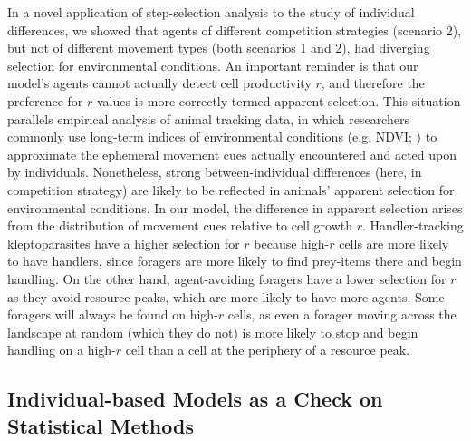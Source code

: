 In a novel application of step-selection analysis to the study of individual differences, we showed that agents of different competition strategies (scenario 2), but not of different movement types (both scenarios 1 and 2), had diverging selection for environmental conditions.
An important reminder is that our model's agents cannot actually detect cell productivity $r$, and therefore the preference for $r$ values is more correctly termed apparent selection.
This situation parallels empirical analysis of animal tracking data, in which researchers commonly use long-term indices of environmental conditions (e.g. NDVI; \citealt{pettorelli2011}) to approximate the ephemeral movement cues actually encountered and acted upon by individuals.
Nonetheless, strong between-individual differences (here, in competition strategy) are likely to be reflected in animals' apparent selection for environmental conditions.
In our model, the difference in apparent selection arises from the distribution of movement cues relative to cell growth $r$.
Handler-tracking kleptoparasites have a higher selection for $r$ because high-$r$ cells are more likely to have handlers, since foragers are more likely to find prey-items there and begin handling.
On the other hand, agent-avoiding foragers have a lower selection for $r$ as they avoid resource peaks, which are more likely to have more agents.
Some foragers will always be found on high-$r$ cells, as even a forager moving across the landscape at random (which they do not) is more likely to stop and begin handling on a high-$r$ cell than a cell at the periphery of a resource peak.

\subsection*{Individual-based Models as a Check on Statistical Methods}

